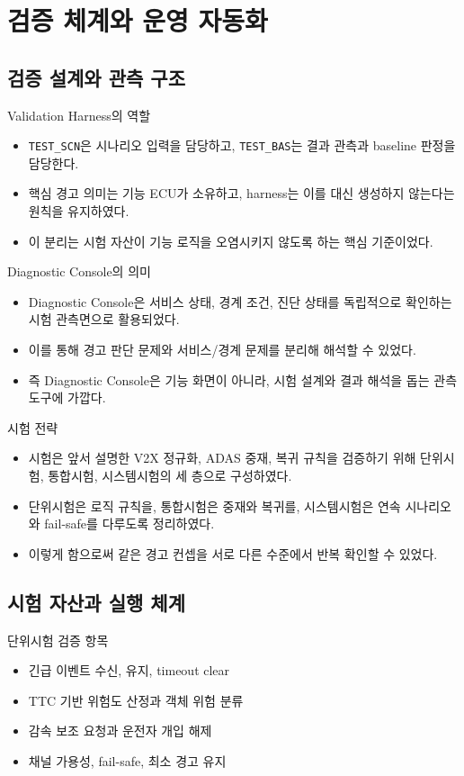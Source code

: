 \documentclass[aspectratio=169,10pt]{beamer}
\begin{document}
\section{검증 체계와 운영 자동화}
\subsection{검증 설계와 관측 구조}

\begin{frame}{Validation Harness의 역할}
\begin{itemize}
  \item \texttt{TEST\_SCN}은 시나리오 입력을 담당하고, \texttt{TEST\_BAS}는 결과 관측과 baseline 판정을 담당한다.
  \item 핵심 경고 의미는 기능 ECU가 소유하고, harness는 이를 대신 생성하지 않는다는 원칙을 유지하였다.
  \item 이 분리는 시험 자산이 기능 로직을 오염시키지 않도록 하는 핵심 기준이었다.
\end{itemize}
\end{frame}

\begin{frame}{Diagnostic Console의 의미}
\begin{itemize}
  \item Diagnostic Console은 서비스 상태, 경계 조건, 진단 상태를 독립적으로 확인하는 시험 관측면으로 활용되었다.
  \item 이를 통해 경고 판단 문제와 서비스/경계 문제를 분리해 해석할 수 있었다.
  \item 즉 Diagnostic Console은 기능 화면이 아니라, 시험 설계와 결과 해석을 돕는 관측 도구에 가깝다.
\end{itemize}
\end{frame}

\begin{frame}{시험 전략}
\begin{itemize}
  \item 시험은 앞서 설명한 V2X 정규화, ADAS 중재, 복귀 규칙을 검증하기 위해 단위시험, 통합시험, 시스템시험의 세 층으로 구성하였다.
  \item 단위시험은 로직 규칙을, 통합시험은 중재와 복귀를, 시스템시험은 연속 시나리오와 fail-safe를 다루도록 정리하였다.
  \item 이렇게 함으로써 같은 경고 컨셉을 서로 다른 수준에서 반복 확인할 수 있었다.
\end{itemize}
\end{frame}

\subsection{시험 자산과 실행 체계}
\begin{frame}{단위시험 검증 항목}
\begin{itemize}
  \item 긴급 이벤트 수신, 유지, timeout clear
  \item TTC 기반 위험도 산정과 객체 위험 분류
  \item 감속 보조 요청과 운전자 개입 해제
  \item 채널 가용성, fail-safe, 최소 경고 유지
\end{itemize}
\end{frame}
\end{document}
